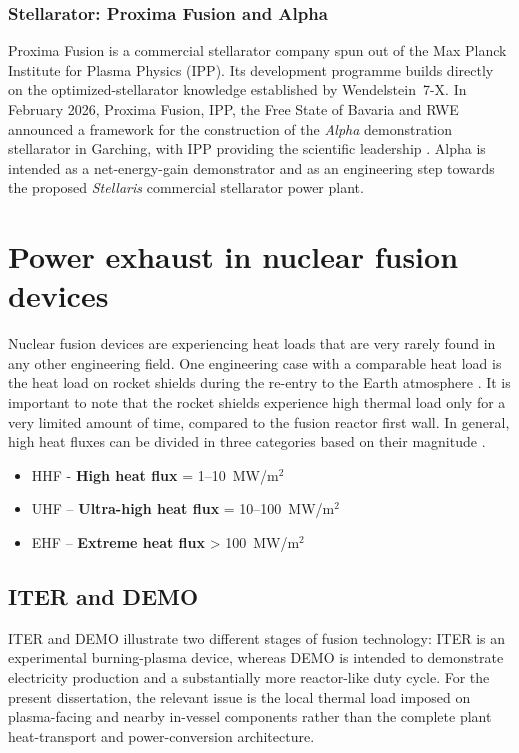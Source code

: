 \documentclass[a4paper]{article}
\begin{document}
\subsubsection{Stellarator: Proxima Fusion and Alpha}
Proxima Fusion is a commercial stellarator company spun out of the Max Planck Institute for Plasma Physics (IPP). Its development programme builds directly on the optimized-stellarator knowledge established by Wendelstein~7-X. In February 2026, Proxima Fusion, IPP, the Free State of Bavaria and RWE announced a framework for the construction of the \textit{Alpha} demonstration stellarator in Garching, with IPP providing the scientific leadership \cite{IPPProximaAlpha2026}. Alpha is intended as a net-energy-gain demonstrator and as an engineering step towards the proposed \textit{Stellaris} commercial stellarator power plant.

\pagebreak
\section{Power exhaust in nuclear fusion devices}
Nuclear fusion devices are experiencing heat loads that are very rarely found in any other engineering field.
One engineering case with a comparable heat load is the heat load on rocket shields during the re-entry to the Earth atmosphere \cite{Park2021}.
It is important to note that the rocket shields experience high thermal load only for a very limited amount of time, compared to the fusion reactor first wall.
In general, high heat fluxes can be divided in three categories based on their magnitude \cite{Woodcock2019,Ebadian2011}.
\begin{itemize}
  \item HHF - \textbf{High heat flux} = 1--10~MW/m$^2$
  \item UHF – \textbf{Ultra-high heat flux} = 10--100~MW/m$^2$
  \item EHF – \textbf{Extreme heat flux} > 100~MW/m$^2$

\end{itemize}

\subsection{ITER and DEMO}
ITER and DEMO illustrate two different stages of fusion technology: ITER is an experimental burning-plasma device, whereas DEMO is intended to demonstrate electricity production and a substantially more reactor-like duty cycle. For the present dissertation, the relevant issue is the local thermal load imposed on plasma-facing and nearby in-vessel components rather than the complete plant heat-transport and power-conversion architecture.
\end{document}
